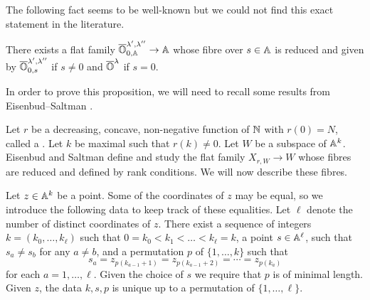 \documentclass{article}
\begin{document}
The following fact seems to be well-known but we could not find this exact statement in the literature.
\begin{proposition} 
    \label{prop:adjoint}
    There exists a flat family $\overline{\OO}^{\lambda', \lambda''}_{0,\AA} \rightarrow \AA$ whose fibre over $s \in \AA$ is reduced and given by $\overline{\OO}^{\lambda', \lambda''}_{0,s}$ if $s \ne 0 $ and $\overline{\OO}^\lambda $ if $ s = 0$.
\end{proposition}
% 
In order to prove this proposition, we will need to recall some results from Eisenbud--Saltman \cite{eisenbud1989rank}. 
% 

Let $ r $ be a decreasing, concave, non-negative function of $\NN$ with $r(0) = N$, called a .  Let $k $ be maximal such that $ r(k) \ne 0 $.
% 
Let $ W$ be a subspace of $ \AA^k$. Eisenbud and Saltman define and study the flat family $ X_{r,W} \rightarrow W$ whose fibres are reduced and defined by rank conditions. We will now describe these fibres. 

Let $ z \in \AA^k$ be a point. Some of the coordinates of $z$ may be equal, so we introduce the following data to keep track of these equalities. Let $ \ell$ denote the number of distinct coordinates of $ z $. There exist a sequence of integers $k = (k_0,\dots,k_\ell)$ such that $ 0=k_0< k_1< \dots < k_\ell = k $, a point $ s \in\AA^\ell$, such that $s_a\ne s_b$ for any $a\ne b$, and a permutation  $ p $ of $ \{1, \dots, k\}$ such that 
$$ 
    s_a = z_{p(k_{a-1}+1)} = z_{p(k_{a-1} + 2)} =  \cdots = z_{p(k_a)}
$$ 
for each $a = 1,\dots,\ell$. 
Given the choice of $ s$ we require that $ p $ is of minimal length. 
Given $z$, the data $k, s, p$ is unique up to a permutation of $ \{1, \dots, \ell\}$.
% 
\end{document}
